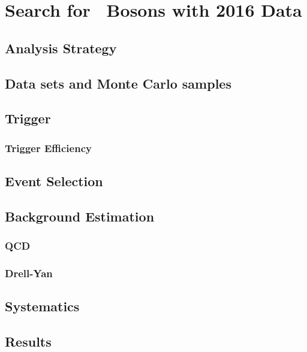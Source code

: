 \chapter[Search For \Zprime~Bosons With 2016 Data]{Search for \Zprime~Bosons with 2016 Data}
\label{chap:Analysis}

\section{Analysis Strategy}
\label{sec:Strategy}

\section{Data sets and Monte Carlo samples}
\label{sec:Samples}

\section{Trigger}
\label{sec:Trigger}

\subsection{Trigger Efficiency}
\label{subsec:TriggerEff}

\section{Event Selection}
\label{sec:EventSelection}

\section{Background Estimation}
\label{sec:BackgroundEstimation}

\subsection{QCD}
\label{subsec:QCD}

\subsection{Drell-Yan}
\label{subsec:QDY}

\section{Systematics}
\label{sec:Systematics}

\section{Results}
\label{sec:Results}
